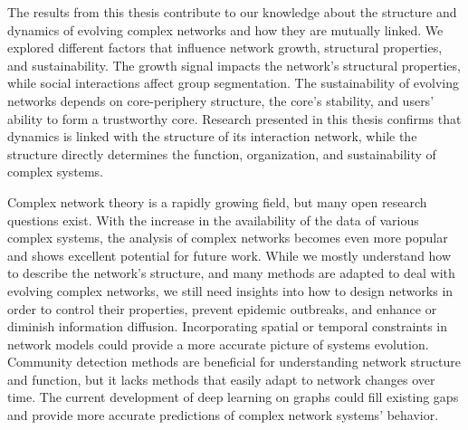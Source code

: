 The results from this thesis contribute to our knowledge about the structure and dynamics of evolving complex networks and how they are mutually linked. We explored different factors that influence network growth, structural properties, and sustainability. The growth signal impacts the network's structural properties, while social interactions affect group segmentation. The sustainability of evolving networks depends on core-periphery structure, the core's stability, and users' ability to form a trustworthy core. Research presented in this thesis confirms that dynamics is linked with the structure of its interaction network, while the structure directly determines the function, organization, and sustainability of complex systems.  




Complex network theory is a rapidly growing field, but many open research questions exist. With the increase in the availability of the data of various complex systems, the analysis of complex networks becomes even more popular and shows excellent potential for future work. While we mostly understand how to describe the network's structure, and many methods are adapted to deal with evolving complex networks, we still need insights into how to design networks in order to control their properties, prevent epidemic outbreaks, and enhance or diminish information diffusion. Incorporating spatial or temporal constraints in network models could provide a more accurate picture of systems evolution. Community detection methods are beneficial for understanding network structure and function, but it lacks methods that easily adapt to network changes over time. The current development of deep learning on graphs could fill existing gaps and provide more accurate predictions of complex network systems' behavior.

\sffamily
{}\selectfont


	

